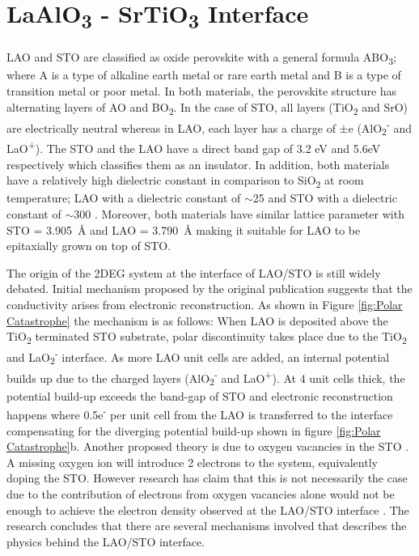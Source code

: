 \documentclass[11pt,a4paper]{report}
\begin{document}
\section{LaAlO\textsubscript{3} - SrTiO\textsubscript{3} Interface}
LAO and STO are classified as oxide perovskite with a general formula ABO\textsubscript{3}; where A is a type of alkaline earth metal or rare earth metal and B is a type of transition metal or poor metal. In both materials, the perovskite structure has alternating layers of AO and BO\textsubscript{2}. In the case of STO, all layers (TiO\textsubscript{2} and SrO) are electrically neutral whereas in LAO, each layer has a charge of $\pm$e (AlO\textsubscript{2}\textsuperscript{-} and LaO\textsuperscript{+}). The STO and the LAO have a direct band gap of 3.2 eV and 5.6eV respectively \cite{ohtomo_hwang_2004} which classifies them as an insulator. In addition, both materials have a relatively high dielectric constant in comparison to SiO\textsubscript{2} at room temperature; LAO with a dielectric constant of $\sim$25 and STO with a dielectric constant of $\sim$300 \cite{ohtomo_hwang_2004}. Moreover, both materials have similar lattice parameter with STO = \SI{3.905}{\angstrom} \cite{koster_1998} and LAO =  \SI{3.790}{\angstrom} \cite{geller_wood_1956} making it suitable for LAO to be epitaxially grown on top of STO.

The origin of the 2DEG system at the interface of LAO/STO is still widely debated. Initial mechanism proposed by the original publication \cite{ohtomo_hwang_2004} suggests that the conductivity arises from electronic reconstruction. As shown in Figure \ref{fig:Polar Catastrophe} the mechanism is as follows: When LAO is deposited above the TiO\textsubscript{2} terminated STO substrate, polar discontinuity takes place due to the TiO\textsubscript{2} and LaO\textsubscript{2}\textsuperscript{-} interface. As more LAO unit cells are added, an internal potential builds up due to the charged layers (AlO\textsubscript{2}\textsuperscript{-} and LaO\textsuperscript{+}). At 4 unit cells thick, the potential build-up exceeds the band-gap of STO and electronic reconstruction happens where 0.5e\textsuperscript{-} per unit cell from the LAO is transferred to the interface compensating for the diverging potential build-up shown in figure \ref{fig:Polar Catastrophe}b. Another proposed theory is due to oxygen vacancies in the STO \cite{kalabukhov_2007}. A missing oxygen ion will introduce 2 electrons to the system, equivalently doping the STO. However research has claim that this is not necessarily the case due to the contribution of electrons from oxygen vacancies alone would not be enough to achieve the electron density observed at the LAO/STO interface \cite{cantoni_gazquez_2012}. The research concludes that there are several mechanisms involved that describes the physics behind the LAO/STO interface. 
\end{document}

